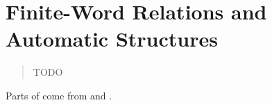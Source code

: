 \chapter{Finite-Word Relations and Automatic Structures}
\label{ch:preliminaries-automatic-structures}

\begin{chapterpresentation}
	\begin{abstract}
		TODO
	\end{abstract}
	\medskip
	\begin{acknowledgements}
		Parts of 
		come from \cite[\S~1]{Morvan2025Algebras} and \cite[\S~B]{Morvan2025Algebras}.
	\end{acknowledgements}
\end{chapterpresentation}
	
\chaptertoc




